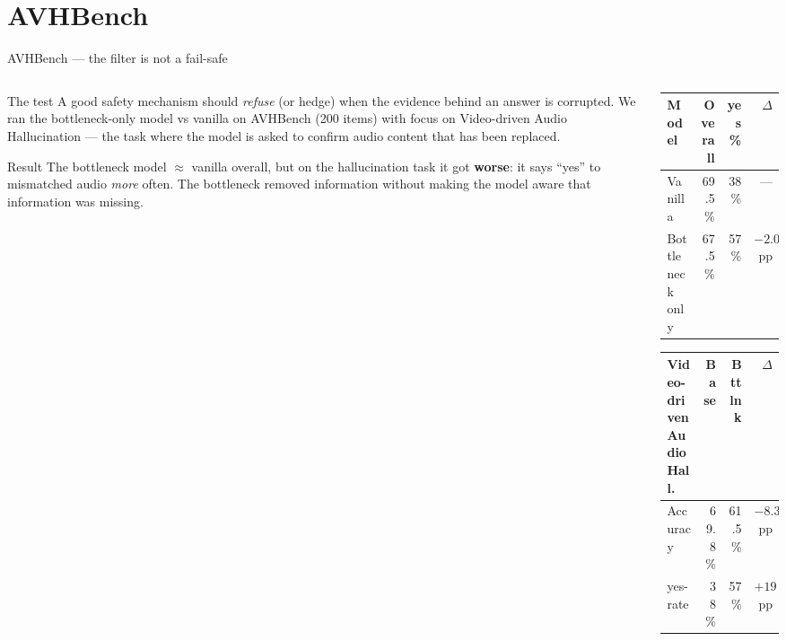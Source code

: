 \documentclass[10pt,aspectratio=169]{beamer}
\begin{document}
\section{AVHBench}

\begin{frame}{AVHBench --- the filter is not a fail-safe}

\begin{columns}[T]
\begin{column}{0.42\textwidth}

\begin{block}{The test}
{\footnotesize
A good safety mechanism should \emph{refuse} (or hedge) when the evidence
behind an answer is corrupted. We ran the bottleneck-only model vs vanilla on
AVHBench (200 items) with focus on Video-driven Audio Hallucination --- the task
where the model is asked to confirm audio content that has been replaced.}
\end{block}

\begin{block}{Result}
{\footnotesize
The bottleneck model $\approx$ vanilla overall, but on the hallucination task it
got \textbf{worse}: it says ``yes'' to mismatched audio \emph{more} often.
The bottleneck removed information without making the model aware that
information was missing.}
\end{block}

\end{column}

\begin{column}{0.55\textwidth}
\scriptsize
\begin{tabular}{l r r r}
\toprule
\textbf{Model} & \textbf{Overall} & \textbf{yes\%} & \textbf{$\Delta$} \\
\midrule
Vanilla   & 69.5\% & 38\% & --- \\
\rowcolor{paperA!8}
Bottleneck only & 67.5\% & 57\% & $-2.0$\,pp \\
\bottomrule
\end{tabular}

\vspace{6pt}
\begin{tabular}{l r r r}
\toprule
\textbf{Video-driven Audio Hall.} & \textbf{Base} & \textbf{Bttlnk} & \textbf{$\Delta$} \\
\midrule
\rowcolor{paperA!10}
Accuracy & 69.8\% & 61.5\% & $-8.3$\,pp \\
yes-rate & 38\% & 57\% & $+19$\,pp \\
\bottomrule
\end{tabular}


\end{column}
\end{columns}
\end{frame}
\end{document}

